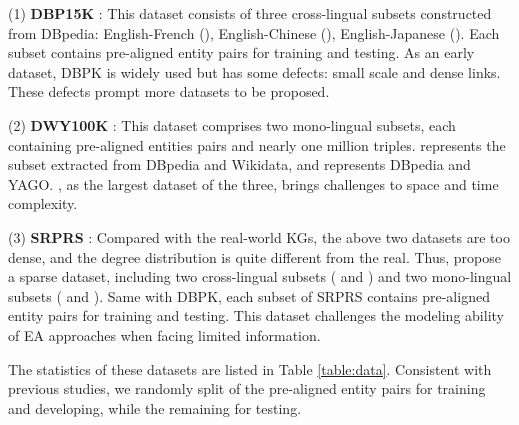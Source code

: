 \documentclass[sigconf]{acmart}
\begin{document}
(1) \textbf{DBP15K} \cite{DBLP:conf/semweb/SunHL17}:
This dataset consists of three cross-lingual subsets constructed from DBpedia: English-French (), English-Chinese (), English-Japanese ().
Each subset contains  pre-aligned entity pairs for training and testing.
As an early dataset, DBPK is widely used but has some defects: small scale and dense links.
These defects prompt more datasets to be proposed.

(2) \textbf{DWY100K} \cite{DBLP:conf/ijcai/SunHZQ18}:  This dataset comprises two mono-lingual subsets, each containing  pre-aligned entities pairs and nearly one million triples.
 represents the subset extracted from DBpedia and Wikidata, and  represents DBpedia and YAGO.
, as the largest dataset of the three, brings challenges to space and time complexity.

(3) \textbf{SRPRS} \cite{DBLP:conf/icml/GuoSH19}:
Compared with the real-world KGs, the above two datasets are too dense, and the degree distribution is quite different from the real.
Thus, \citet{DBLP:conf/icml/GuoSH19} propose a sparse dataset, including two cross-lingual subsets ( and ) and two mono-lingual subsets ( and ).
Same with DBPK, each subset of SRPRS contains  pre-aligned entity pairs for training and testing.
This dataset challenges the modeling ability of EA approaches when facing limited information.

The statistics of these datasets are listed in Table \ref{table:data}.
Consistent with previous studies, we randomly split  of the pre-aligned entity pairs for training and developing, while the remaining  for testing.
\end{document}

